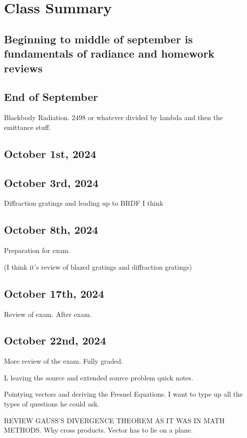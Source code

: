 \documentclass{article}
\begin{document}
\section{Class Summary}


\subsection{Beginning to middle of september is fundamentals of radiance and homework reviews}

\subsection{End of September}
Blackbody Radiation. 2498 or whatever divided by lambda and then the emittance stuff. 

\subsection{October 1st, 2024}


\subsection{October 3rd, 2024}
Diffraction gratings and leading up to BRDF I think



\subsection{October 8th, 2024}
Preparation for exam. 

(I think it's review of blazed gratings and diffraction gratings)


\subsection{October 17th, 2024}
Review of exam. After exam. 


\subsection{October 22nd, 2024}
More review of the exam. Fully graded. 

L leaving the source and extended source problem quick notes. 


Pointying vectors and deriving the Fresnel Equations. 
I want to type up all the types of questions he could ask. 

REVIEW GAUSS'S DIVERGENCE THEOREM AS IT WAS IN MATH METHODS. 
Why cross products. Vector has to lie on a plane. 
\end{document}
